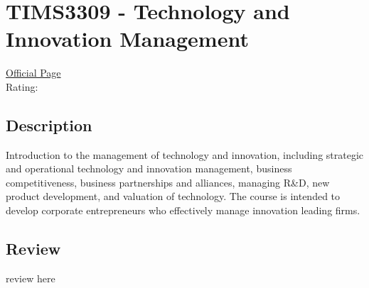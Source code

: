 \hypertarget{TIMS3309}{\section{TIMS3309 - Technology and Innovation Management}}

\large
\textcolor{turbo_purple}{\href{https://my.uq.edu.au/programs-courses/course.html?course_code=TIMS3309}{Official Page}} \\
Rating: \cstar\cstar\cstar\cstar\ostar

\normalsize
\subsection*{Description}
Introduction to the management of technology and innovation, including strategic and operational technology and innovation management, business competitiveness, business partnerships and alliances, managing R\&D, new product development, and valuation of technology.
The course is intended to develop corporate entrepreneurs who effectively manage innovation leading firms.

\subsection*{Review}
review here
